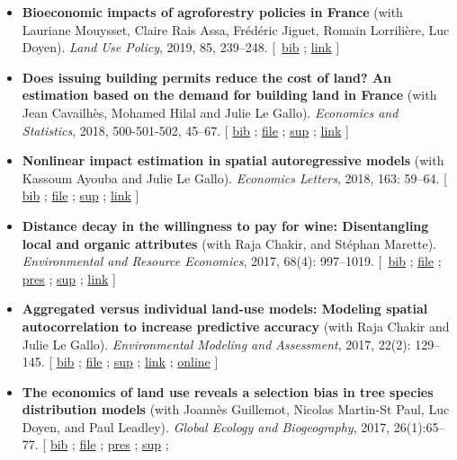 \documentclass[11pt, a4paper]{./style}
\begin{document}
\begin{itemize}
\item \textbf{Bioeconomic impacts of agroforestry policies in France} (with
Lauriane Mouysset, Claire Rais Assa, Frédéric Jiguet, Romain
Lorrilière, Luc Doyen). \emph{Land Use Policy}, 2019, 85, 239--248.
[~\href{bib/BIOFOR.bib}{bib} ; \href{https://www.sciencedirect.com/science/article/abs/pii/S0264837718308160}{link} ]
\item \textbf{Does issuing building permits reduce the cost of land? An
estimation based on the demand for building land in France} (with
Jean Cavailhès, Mohamed Hilal and Julie Le Gallo). \emph{Economics and
Statistics}, 2018, 500-501-502, 45--67.  [ \href{bib/PCPX.bib}{bib} ; \href{doc/PCPX-FILE.pdf}{file} ; \href{doc/PCPX-SUP.pdf}{sup} ;
\href{https://insee.fr/en/statistiques/3621981?sommaire=3622133}{link} ]
\item \textbf{Nonlinear impact estimation in spatial autoregressive models}
(with Kassoum Ayouba and Julie Le Gallo). \emph{Economics Letters},
2018, 163: 59--64. [ \href{bib/NLSP.bib}{bib} ; \href{doc/NLSP-FILE.pdf}{file} ; \href{doc/NLSP-SUP.pdf}{sup} ; \href{https://www.sciencedirect.com/science/article/pii/S0165176517304846}{link} ]
\item \textbf{Distance decay in the willingness to pay for wine: Disentangling
local and organic attributes} (with Raja Chakir, and Stéphan
Marette). \emph{Environmental and Resource Economics}, 2017, 68(4):
997--1019. [~\href{bib/DWTP.bib}{bib} ; \href{doc/DWTP-FILE.pdf}{file} ; \href{doc/DWTP-PRES.pdf}{pres} ; \href{doc/DWTP-SUP.pdf}{sup} ; \href{https://link.springer.com/article/10.1007/s10640-016-0057-8}{link} ]
\item \textbf{Aggregated versus individual land-use models: Modeling spatial
autocorrelation to increase predictive accuracy} (with Raja
Chakir and Julie Le Gallo). \emph{Environmental Modeling and
Assessment}, 2017, 22(2): 129--145. [ \href{bib/LUMP.bib}{bib} ; \href{doc/LUMP-FILE.pdf}{file} ; \href{doc/LUMP-SUP.pdf}{sup} ; \href{https://link.springer.com/article/10.1007/s10666-016-9523-5}{link} ;
\href{https://github.com/jsay/spatial-pred-R}{online} ]
\item \textbf{The economics of land use reveals a selection bias in tree
species distribution models} (with Joannès Guillemot, Nicolas
Martin-St Paul, Luc Doyen, and Paul Leadley). \emph{Global Ecology and
Biogeography}, 2017, 26(1):65--77. [ \href{bib/NTSDM.bib}{bib} ; \href{doc/NTSDM-FILE.pdf}{file} ; \href{doc/NTSDM-PRES.pdf}{pres} ; \href{doc/NTSDM-SUP.pdf}{sup} ;

\end{itemize}
\end{document}
